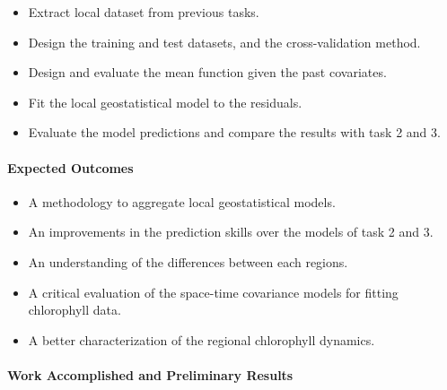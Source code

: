 \begin{itemize}
  \item Extract local dataset from previous tasks.
  \item Design the training and test datasets, and the cross-validation method.
  \item Design and evaluate the mean function given the past covariates.
  \item Fit the local geostatistical model to the residuals.
  \item Evaluate the model predictions and compare the results with task 2 and 3.
\end{itemize}

\paragraph{Expected Outcomes}

\begin{itemize}
\item A methodology to aggregate local geostatistical models.
\item An improvements in the prediction skills over the models of task 2 and 3.
\item An understanding of the differences between each regions.
\item A critical evaluation of the space-time covariance models for fitting chlorophyll data.
\item A better characterization of the regional chlorophyll dynamics.
\end{itemize}

\paragraph{Work Accomplished and Preliminary Results}


